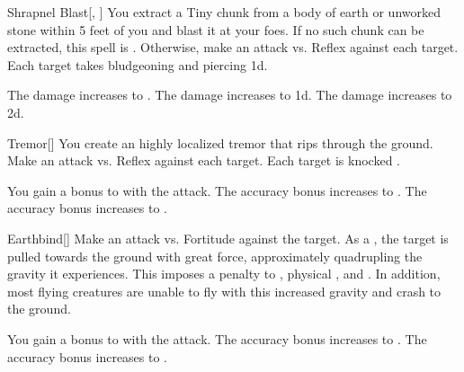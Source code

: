 \lowercase{\hypertarget{spell:Shrapnel Blast}{}}\label{spell:Shrapnel Blast}
\begin{freeability}[Rank 1]{\hypertarget{spell:Shrapnel Blast}{Shrapnel Blast}}[, ]
You extract a Tiny chunk from a body of earth or unworked stone within 5 feet of you and blast it at your foes.
If no such chunk can be extracted, this spell is .
Otherwise, make an attack vs. Reflex against each target.
\hit Each target takes bludgeoning and piercing  \minus1d.

\rankline
{} The damage increases to .
 The damage increases to  \plus1d.
 The damage increases to  \plus2d.

\end{freeability}
\vspace{0.25em}



\lowercase{\hypertarget{spell:Tremor}{}}\label{spell:Tremor}
\begin{freeability}[Rank 1]{\hypertarget{spell:Tremor}{Tremor}}[]
You create an highly localized tremor that rips through the ground.
Make an attack vs. Reflex against each target.
\hit Each target is knocked .

\rankline
{} You gain a  bonus to  with the attack.
 The accuracy bonus increases to .
 The accuracy bonus increases to .

\end{freeability}
\vspace{0.25em}



\lowercase{\hypertarget{spell:Earthbind}{}}\label{spell:Earthbind}
\begin{freeability}[Rank 2]{\hypertarget{spell:Earthbind}{Earthbind}}[]
Make an attack vs. Fortitude against the target.
\hit As a , the target is pulled towards the ground with great force, approximately quadrupling the gravity it experiences.
This imposes a  penalty to , physical , and .
In addition, most flying creatures are unable to fly with this increased gravity and crash to the ground.

\rankline
{} You gain a  bonus to  with the attack.
 The accuracy bonus increases to .
 The accuracy bonus increases to .

\end{freeability}
\vspace{0.25em}



